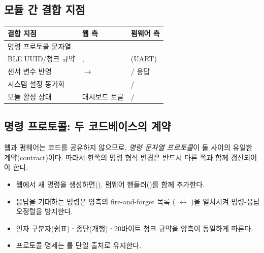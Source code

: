 \subsection{모듈 간 결합 지점}

\begin{longtable}{L{4.6cm} L{4.4cm} L{4.4cm}}
\toprule
{}\textbf{결합 지점} & \textbf{웹 측} & \textbf{펌웨어 측} \\
\midrule
\endhead
명령 프로토콜 문자열 &  &  \\
BLE UUID/청크 규약 & ,  & (UART) \\
센서 변수 반영 &  $\to$  & / 응답 \\
시스템 설정 동기화 &  & / \\
모듈 활성 상태 & 대시보드 토글 & / \\
\bottomrule
\end{longtable}

\subsection{명령 프로토콜: 두 코드베이스의 계약}

웹과 펌웨어는 코드를 공유하지 않으므로, \emph{명령 문자열 프로토콜}이 둘
사이의 유일한 계약(contract)이다. 따라서 한쪽의 명령 형식 변경은 반드시
다른 쪽과 함께 갱신되어야 한다.

\begin{infobox}[title=프로토콜 변경 시 동기화 규칙]
\begin{itemize}
  \item 웹에서 새 명령을 생성하면(),
        펌웨어 핸들러()를 함께 추가한다.
  \item 응답을 기대하는 명령은 양측의 fire-and-forget 목록
        ( $\leftrightarrow$ )을
        일치시켜 명령-응답 오정렬을 방지한다.
  \item 인자 구분자(쉼표)\textbf{·}종단(개행)\textbf{·}20바이트 청크 규약을 양측이
        동일하게 따른다.
  \item 프로토콜 명세는 를 단일 출처로 유지한다.
\end{itemize}
\end{infobox}


